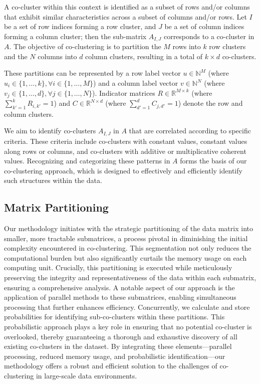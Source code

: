 A co-cluster within this context is identified as a subset of rows and/or columns that exhibit similar characteristics across a subset of columns and/or rows. Let $I$ be a set of row indices forming a row cluster, and $J$ be a set of column indices forming a column cluster; then the sub-matrix $A_{I,J}$ corresponds to a co-cluster in $A$. The objective of co-clustering is to partition the $M$ rows into $k$ row clusters and the $N$ columns into $d$ column clusters, resulting in a total of $k \times d$ co-clusters.

These partitions can be represented by a row label vector $u \in \mathbb{N}^M$ (where $u_i \in \{1, \ldots, k\}, \forall i \in \{1, \ldots, M\}$) and a column label vector $v \in \mathbb{N}^N$ (where $v_j \in \{1, \ldots, d\}, \forall j \in \{1, \ldots, N\}$). Indicator matrices $R \in \mathbb{R}^{M \times k}$ (where $\sum_{k'=1}^{k} R_{i,k'} = 1$) and $C \in \mathbb{R}^{N \times d}$ (where $\sum_{d'=1}^{d} C_{j,d'} = 1$) denote the row and column clusters. 

We aim to identify co-clusters $A_{I,J}$ in $A$ that are correlated according to specific criteria. These criteria include co-clusters with constant values, constant values along rows or columns, and co-clusters with additive or multiplicative coherent values. Recognizing and categorizing these patterns in $A$ forms the basis of our co-clustering approach, which is designed to effectively and efficiently identify such structures within the data.

\subsection{Matrix Partitioning}
Our methodology initiates with the strategic partitioning of the data matrix into smaller, more tractable submatrices, a process pivotal in diminishing the initial complexity encountered in co-clustering. This segmentation not only reduces the computational burden but also significantly curtails the memory usage on each computing unit. Crucially, this partitioning is executed while meticulously preserving the integrity and representativeness of the data within each submatrix, ensuring a comprehensive analysis. A notable aspect of our approach is the application of parallel methods to these submatrices, enabling simultaneous processing that further enhances efficiency. Concurrently, we calculate and store probabilities for identifying sub-co-clusters within these partitions. This probabilistic approach plays a key role in ensuring that no potential co-cluster is overlooked, thereby guaranteeing a thorough and exhaustive discovery of all existing co-clusters in the dataset. By integrating these elements—parallel processing, reduced memory usage, and probabilistic identification—our methodology offers a robust and efficient solution to the challenges of co-clustering in large-scale data environments.

